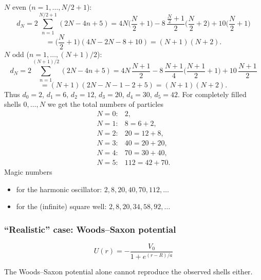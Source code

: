 \documentclass[11pt,a4paper]{article}
\begin{document}
$N$ even ($n=1,\dots,N/2+1$):
\[
d_N=2\sum_{n=1}^{N/2+1}(2N-4n+5)
=4N\Big(\frac N2+1\Big)-8\,\frac{\frac N2+1}{2}\Big(\frac N2+2\Big)+10\Big(\frac N2+1\Big)
\]
\[
=\Big(\frac N2+1\Big)(4N-2N-8+10)=(N+1)(N+2).
\]
$N$ odd ($n=1,\dots,(N+1)/2$):
\[
d_N=2\sum_{n=1}^{(N+1)/2}(2N-4n+5)
=4N\,\frac{N+1}{2}-8\,\frac{N+1}{4}\Big(\frac{N+1}{2}+1\Big)+10\,\frac{N+1}{2}
\]
\[
=(N+1)(2N-N-1-2+5)=(N+1)(N+2).
\]
Thus $d_0=2$, $d_1=6$, $d_2=12$, $d_3=20$, $d_4=30$, $d_5=42$. For completely filled shells $0,\dots,N$ we get the total numbers of particles
\[
\begin{array}{ll}
N=0: & 2,\\
N=1: & 8=6+2,\\
N=2: & 20=12+8,\\
N=3: & 40=20+20,\\
N=4: & 70=30+40,\\
N=5: & 112=42+70.
\end{array}
\]
Magic numbers
\begin{itemize}
\item for the harmonic oscillator: $2,8,20,40,70,112,\dots$
\item for the (infinite) square well: $2,8,20,34,58,92,\dots$
\end{itemize}

\subsubsection*{``Realistic'' case: Woods--Saxon potential}
\[
U(r)=-\frac{V_0}{1+e^{(r-R)/a}}
\]
\begin{center}
\end{center}
The Woods--Saxon potential alone cannot reproduce the observed shells either.
\end{document}
